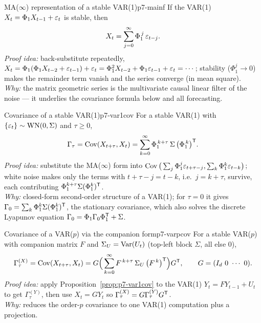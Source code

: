 \begin{proposition}{MA($\infty$) representation of a stable VAR(1)}{p7-mainf}
If the VAR(1) $X_t=\Phi_1 X_{t-1}+\varepsilon_t$ is stable, then
\[
X_t=\sum_{j=0}^{\infty}\Phi_1^{\,j}\,\varepsilon_{t-j}.
\]
\textit{Proof idea:} back-substitute repeatedly,
$X_t=\Phi_1(\Phi_1 X_{t-2}+\varepsilon_{t-1})+\varepsilon_t=\Phi_1^2X_{t-2}+\Phi_1\varepsilon_{t-1}+\varepsilon_t=\cdots$;
stability ($\Phi_1^j\to0$) makes the remainder term vanish and the series
converge (in mean square).\\
\textit{Why:} the matrix geometric series is the multivariate causal linear
filter of the noise --- it underlies the covariance formula below and all
forecasting.
\end{proposition}

\begin{proposition}{Covariance of a stable VAR(1)}{p7-var1cov}
For a stable VAR(1) with $\{\varepsilon_t\}\sim\mathrm{WN}(0,\Sigma)$ and $\tau\ge0$,
\[
\Gamma_\tau=\operatorname{Cov}(X_{t+\tau},X_t)
=\sum_{k=0}^{\infty}\Phi_1^{\,k+\tau}\,\Sigma\,\big(\Phi_1^{\,k}\big)^{\mathsf{T}} .
\]
\textit{Proof idea:} substitute the MA($\infty$) form into
$\operatorname{Cov}\big(\sum_j\Phi_1^{j}\varepsilon_{t+\tau-j},\sum_k\Phi_1^{k}\varepsilon_{t-k}\big)$;
white noise makes only the terms with $t+\tau-j=t-k$, i.e.\ $j=k+\tau$, survive,
each contributing $\Phi_1^{k+\tau}\Sigma(\Phi_1^{k})^{\mathsf{T}}$.\\
\textit{Why:} closed-form second-order structure of a VAR(1); for $\tau=0$ it
gives $\Gamma_0=\sum_k\Phi_1^k\Sigma(\Phi_1^k)^{\mathsf{T}}$, the stationary covariance,
which also solves the discrete Lyapunov equation
$\Gamma_0=\Phi_1\Gamma_0\Phi_1^{\mathsf{T}}+\Sigma$.
\end{proposition}

\begin{corollary}{Covariance of a VAR($p$) via the companion form}{p7-varpcov}
For a stable VAR($p$) with companion matrix $F$ and
$\Sigma_U=\operatorname{Var}(U_t)$ (top-left block $\Sigma$, all else $0$),
\[
\Gamma_\tau^{(X)}=\operatorname{Cov}(X_{t+\tau},X_t)
=G\Big(\sum_{k=0}^{\infty}F^{\,k+\tau}\,\Sigma_U\,\big(F^{\,k}\big)^{\mathsf{T}}\Big)G^{\mathsf{T}},
\qquad G=(I_d\ 0\ \cdots\ 0).
\]
\textit{Proof idea:} apply Proposition~\ref{prop:p7-var1cov} to the VAR(1)
$Y_t=FY_{t-1}+U_t$ to get $\Gamma_\tau^{(Y)}$, then use $X_t=GY_t$ so
$\Gamma_\tau^{(X)}=G\Gamma_\tau^{(Y)}G^{\mathsf{T}}$.\\
\textit{Why:} reduces the order-$p$ covariance to one VAR(1) computation plus a
projection.
\end{corollary}

